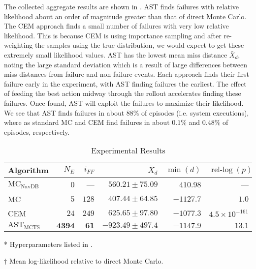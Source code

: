 The collected aggregate results are shown in .
AST finds failures with relative likelihood about an order of magnitude greater than that of direct Monte Carlo.
The CEM approach finds a small number of failures with very low relative likelihood.
This is because CEM is using importance sampling and after re-weighting the samples using the true distribution, we would expect to get these extremely small likelihood values.
AST has the lowest mean miss distance $\bar{X}_d$, noting the large standard deviation which is a result of large differences between miss distances from failure and non-failure events.
Each approach finds their first failure early in the experiment, with AST finding failures the earliest.
The effect of feeding the best action midway through the rollout accelerates finding these failures.
Once found, AST will exploit the failures to maximize their likelihood.
We see that AST finds failures in about $88\%$ of episodes (i.e. system executions), where as standard MC and CEM find failures in about $0.1\%$ and $0.48\%$ of episodes, respectively.




\begin{table}[!ht]
  \centering
  \caption{\label{tab:ast_results} Experimental Results}
  \begin{threeparttable}
  \begin{tabular}{@{}lrrrrr@{}}
    \toprule
    Algorithm\tnote{*} & $N_E$ & $i_{FF}$ & $\bar{X}_d$ & $\min(d)$ & $\operatorname{rel-log}(p)$\tnote{$\dagger$}\\
    \midrule
    $\text{MC}_\text{NavDB}$ & $0$          & ---        & $560.21 \pm75.09$       & $410.98$         & ---\\
    MC                       & $5$          & $128$        & $407.44 \pm64.85$       & $-1127.7$      & $1.0$\\
    CEM                      & $24$         & $249$        & $625.65 \pm97.80$        & $-1077.3$      & $4.5\times 10^{-161}$\\
    $\text{AST}_\text{MCTS}$ & $\bm{4394}$ & $\bm{61}$ & $\bm{-923.49 \pm497.4}$ & $\bm{-1147.9}$ & $\bm{13.1}$\\
    \bottomrule
  \end{tabular}
  \begin{tablenotes}
      \item[*] {Hyperparameters listed in .}
      \item[$\dagger$] {Mean log-likelihood relative to direct Monte Carlo.}
  \end{tablenotes}
  \end{threeparttable}
\end{table}




